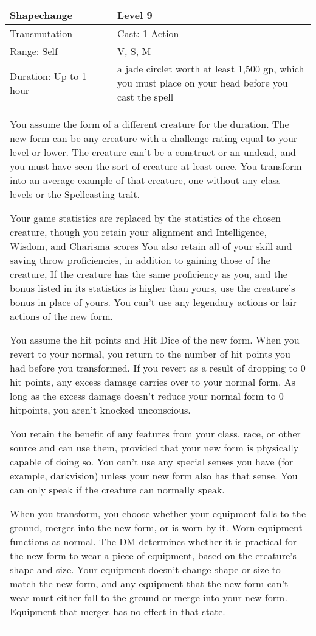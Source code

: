 \documentclass[11pt]{report}
\begin{document}
\begin{table}[H]
	\begin{tabular}{||p{6cm}|p{6cm}||}
		\hline\hline
		\bf{Shapechange} & Level 9\\ \hline
		Transmutation & Cast: 1 Action\\ \hline
		Range: Self & V, S, M\\ \hline
		Duration: Up to 1 hour & a jade circlet worth at least 1,500 gp, which you must place on your head before you cast the spell\\ \hline
		\multicolumn{2}{||p{12cm}||}{You assume the form of a different creature for the duration.
The new form can be any creature with a challenge rating equal to your level or lower. The creature can’t be a construct or an undead, and you must have seen the sort of creature at least once. You transform into an average example of that creature, one without any class levels or the Spellcasting trait.

Your game statistics are replaced by the statistics of the chosen creature, though you retain your alignment and Intelligence, Wisdom, and Charisma scores You also retain all of your skill and saving throw proficiencies, in addition to gaining those of the creature, If the creature has the same proficiency as you, and the bonus listed in its statistics is higher than yours, use the creature’s bonus in place of yours. You can’t use any legendary actions or lair actions of the new form.

You assume the hit points and Hit Dice of the new form. When you revert to your normal, you return to the number of hit points you had before you transformed. If you revert as a result of dropping to 0 hit points, any excess damage carries over to your normal form. As long as the excess damage doesn’t reduce your normal form to 0 hitpoints, you aren’t knocked unconscious.

You retain the benefit of any features from your class, race, or other source and can use them, provided that your new form is physically capable of doing so. You can’t use any special senses you have (for example, darkvision) unless your new form also has that sense. You can only speak if the creature can normally speak.

When you transform, you choose whether your equipment falls to the ground, merges into the new form, or is worn by it. Worn equipment functions as normal. The DM determines whether it is practical for the new form to wear a piece of equipment, based on the creature’s shape and size. Your equipment doesn’t change shape or size to match the new form, and any equipment that the new form can’t wear must either fall to the ground or merge into your new form. Equipment that merges has no effect in that state.

}
\end{tabular}
\end{table}
\end{document}

